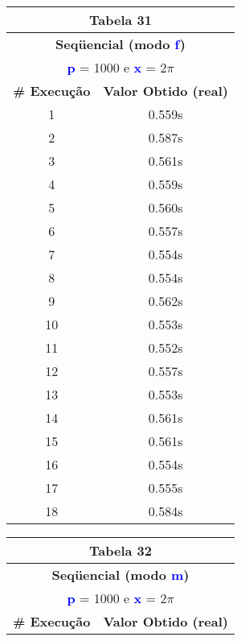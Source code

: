 \documentclass[11pt]{article}
\begin{document}
\begin{table}[!h]
	\begin{center}
		\begin{minipage}{0.48\textwidth}
			\begin{tabular}{| c | c |}
			\hline
			\multicolumn{2}{|c|}{\textbf{Tabela 31}} \\ \hline
			\multicolumn{2}{|c|}{\textbf{Seqüencial (modo \textbf{\textcolor{blue}{f}})}} \\
			\multicolumn{2}{|c|}{\textbf{\textcolor{blue}{p}} = 1000 e \textbf{\textcolor{blue}{x}} = $2\pi$} \\ [0.2ex]
			\hline
				\textbf{\# Execução} &  \textbf{Valor Obtido (real)} \\ \hline
				1 & 0.559s \\ \hline
				2 & 0.587s \\ \hline
				3 & 0.561s \\ \hline
				4 & 0.559s \\ \hline
				5 & 0.560s \\ \hline
				6 & 0.557s \\ \hline
				7 & 0.554s \\ \hline
				8 & 0.554s \\ \hline
				9 & 0.562s \\ \hline
				10 & 0.553s \\ \hline
				11 & 0.552s \\ \hline
				12 & 0.557s \\ \hline
				13 & 0.553s \\ \hline
				14 & 0.561s \\ \hline
				15 & 0.561s \\ \hline
				16 & 0.554s \\ \hline
				17 & 0.555s \\ \hline
				18 & 0.584s \\ \hline
			\end{tabular}
		\end{minipage}
		\begin{minipage}{0.48\textwidth}
			\begin{tabular}{| c | c |}
			\hline
			\multicolumn{2}{|c|}{\textbf{Tabela 32}} \\ \hline
			\multicolumn{2}{|c|}{\textbf{Seqüencial (modo \textbf{\textcolor{blue}{m}})}} \\
			\multicolumn{2}{|c|}{\textbf{\textcolor{blue}{p}} = 1000 e \textbf{\textcolor{blue}{x}} = $2\pi$} \\ [0.2ex]
			\hline
				\textbf{\# Execução} &  \textbf{Valor Obtido (real)} \\ \hline

\end{tabular}
\end{minipage}
\end{center}
\end{table}
\end{document}
